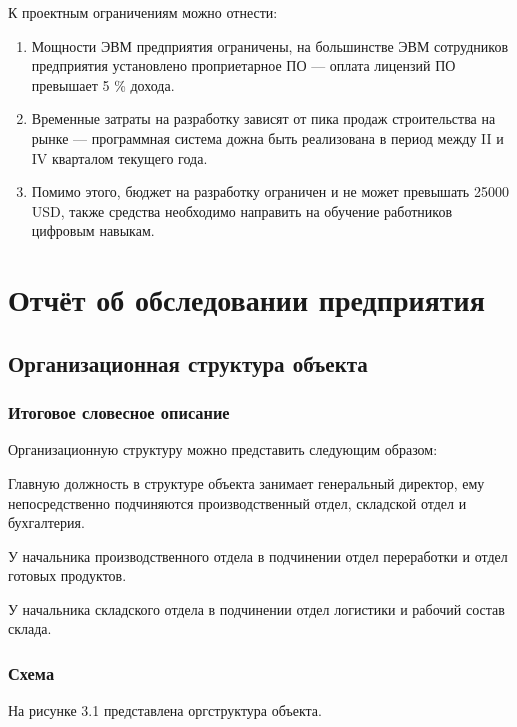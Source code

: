 К проектным ограничениям можно отнести:

\begin{enumerate}
	\item{Мощности ЭВМ предприятия ограничены, на большинстве ЭВМ сотрудников предприятия установлено проприетарное ПО --- оплата лицензий ПО превышает 5 \% дохода.}

	\item{Временные затраты на разработку зависят от пика продаж строительства на рынке --- программная система дожна быть реализована в период между II и IV кварталом текущего года.}

	\item{Помимо этого, бюджет на разработку ограничен и не может превышать 25000 USD, также средства необходимо направить на обучение работников цифровым навыкам.} 

\end{enumerate}

\section{Отчёт об обследовании предприятия}

\subsection{Организационная структура объекта}

\subsubsection{Итоговое словесное описание}

Организационную структуру можно представить следующим образом:

Главную должность в структуре объекта занимает генеральный директор, ему непосредственно подчиняются производственный отдел, складской отдел и бухгалтерия.

У начальника производственного отдела в подчинении отдел переработки и отдел готовых продуктов.

У начальника складского отдела в подчинении отдел логистики и рабочий состав склада.

\subsubsection{Схема}

На рисунке 3.1 представлена оргструктура объекта.

